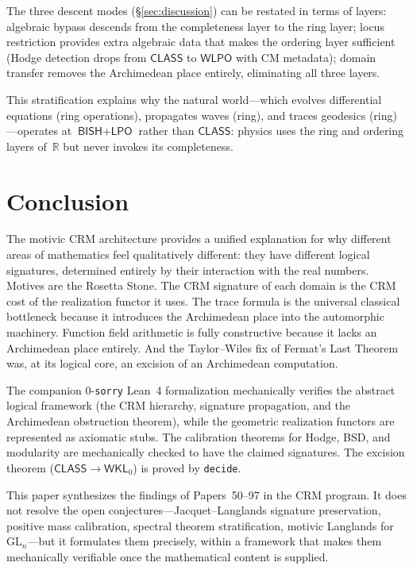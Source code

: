 \documentclass[11pt,a4paper]{article}
\theoremstyle{plain}
\theoremstyle{definition}
\newcommand{\BISH}{\textsf{BISH}}
\newcommand{\WKL}{\textsf{WKL}_0}
\newcommand{\WLPO}{\textsf{WLPO}}
\newcommand{\LPO}{\textsf{LPO}}
\newcommand{\CLASS}{\textsf{CLASS}}
\newcommand{\R}{\mathbb{R}}
\newcommand{\GL}{\mathrm{GL}}
\begin{document}
The three descent modes (\S\ref{sec:discussion}) can be restated in terms of layers: algebraic bypass descends from the completeness layer to the ring layer; locus restriction provides extra algebraic data that makes the ordering layer sufficient (Hodge detection drops from $\CLASS$ to $\WLPO$ with CM metadata); domain transfer removes the Archimedean place entirely, eliminating all three layers.

This stratification explains why the natural world---which evolves differential equations (ring operations), propagates waves (ring), and traces geodesics (ring)---operates at $\BISH + \LPO$ rather than $\CLASS$: physics uses the ring and ordering layers of~$\R$ but never invokes its completeness.

\section{Conclusion}\label{sec:conclusion}

The motivic CRM architecture provides a unified explanation for why different areas of mathematics feel qualitatively different: they have different logical signatures, determined entirely by their interaction with the real numbers. Motives are the Rosetta Stone. The CRM signature of each domain is the CRM cost of the realization functor it uses. The trace formula is the universal classical bottleneck because it introduces the Archimedean place into the automorphic machinery. Function field arithmetic is fully constructive because it lacks an Archimedean place entirely. And the Taylor--Wiles fix of Fermat's Last Theorem was, at its logical core, an excision of an Archimedean computation.

The companion 0-\texttt{sorry} Lean~4 formalization mechanically verifies the abstract logical framework (the CRM hierarchy, signature propagation, and the Archimedean obstruction theorem), while the geometric realization functors are represented as axiomatic stubs. The calibration theorems for Hodge, BSD, and modularity are mechanically checked to have the claimed signatures. The excision theorem ($\CLASS \to \WKL$) is proved by \texttt{decide}.

This paper synthesizes the findings of Papers~50--97 in the CRM program. It does not resolve the open conjectures---Jacquet--Langlands signature preservation, positive mass calibration, spectral theorem stratification, motivic Langlands for $\GL_n$---but it formulates them precisely, within a framework that makes them mechanically verifiable once the mathematical content is supplied.
\end{document}
